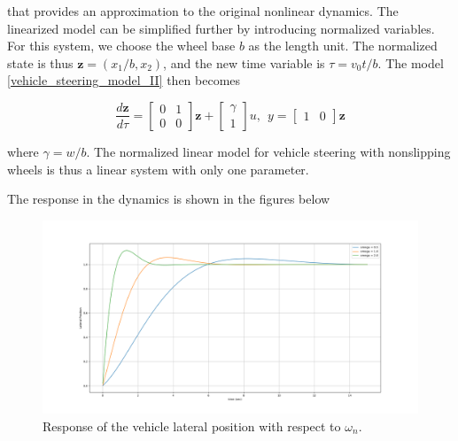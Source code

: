 that provides an approximation to the original nonlinear dynamics.
The linearized model can be simplified further by introducing normalized variables. For this system, we choose the wheel base $b$ as the length unit.  The normalized state is thus $\mathbf{z} = (x_1/b, x_2 )$, 
and the new time variable is $\tau = v_0t/b$.
The model \ref{vehicle_steering_model_II} then becomes

\begin{equation}
\frac{d\mathbf{z}}{d\tau} = 
\begin{bmatrix}
   0 & 1 \\
   0 & 0
\end{bmatrix}\mathbf{z}+
\begin{bmatrix}
   \gamma \\
   1
\end{bmatrix}u,  ~~ y= 
\begin{bmatrix}
   1 & 0
\end{bmatrix}\mathbf{z}
\label{vehicle_steering_model_3}
\end{equation}
 
where $\gamma = w/b$. The  normalized  linear model for  vehicle  steering  with nonslipping wheels is thus a linear system with only one parameter.

The response in the dynamics is shown in the figures below

\begin{figure}[!htb]
\begin{center}
\includegraphics[scale=0.280]{img/state_feedback/lateral_position_response.png}
\end{center}
\caption{Response of the vehicle lateral position with respect to $\omega_n$.}
\label{lateral_position_response}
\end{figure}


